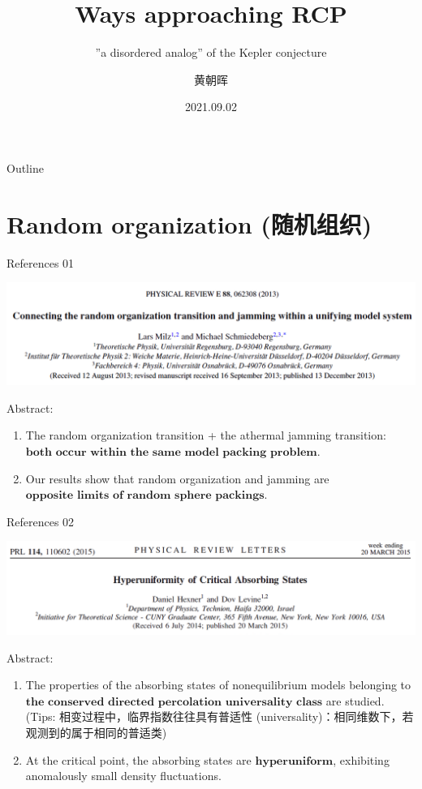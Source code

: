 \documentclass{bredelebeamer}
\title[每周讨论]{Ways approaching RCP}
\subtitle{''a disordered analog'' of the
Kepler conjecture}
\author{黄朝晖\inst{1}}
\institute[北京大学]
{
  \inst{1}%
  力学与工程科学系 \quad 北京大学
}
\date{2021.09.02}
\begin{document}
\begin{frame}
  \titlepage
\end{frame}


\begin{frame}{Outline}
  \tableofcontents
\end{frame}




\section{Random organization (随机组织)}
\begin{frame}{References 01}
\centerline{\includegraphics[scale=0.2]{images/p1.png}}
Abstract:
\begin{enumerate}[]
\item The random organization transition + the athermal jamming transition: $\textbf{both
occur within the same model packing problem}$.
\item Our results show that random organization and jamming are $\textbf{opposite limits of
random sphere packings}$.
\end{enumerate}
\end{frame}

\begin{frame}{References 02}
\centerline{\includegraphics[scale=0.2]{images/p2.png}}
Abstract:
\begin{enumerate}[]
\item The properties of the absorbing states of nonequilibrium models belonging to $\textbf{the conserved directed percolation universality class}$ are studied. (Tips: 相变过程中，临界指数往往具有普适性 (universality)：相同维数下，若观测到的属于相同的普适类)
\item At the critical point, the absorbing states are $\textbf{hyperuniform}$, exhibiting anomalously small density fluctuations.
\end{enumerate}
\end{frame}
\end{document}
